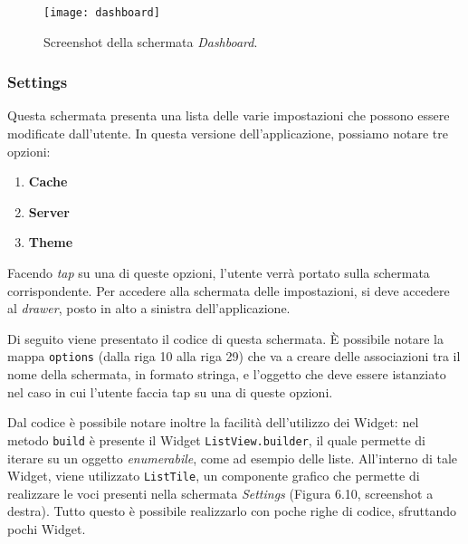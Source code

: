 \begin{figure}[htp]
	\centering
	\texttt{[image: dashboard]}
	\caption[Screenshot - Dashboard]{Screenshot della schermata \textit{Dashboard}.}\label{xyz}
\end{figure}

\newpage

\subsubsection{Settings}
Questa schermata presenta una lista delle varie impostazioni che possono essere modificate dall'utente. In questa versione dell'applicazione, possiamo notare tre opzioni:
\begin{enumerate}
	\item \textbf{Cache}
	\item \textbf{Server}
	\item \textbf{Theme}
\end{enumerate}

Facendo \textit{tap} su una di queste opzioni, l'utente verrà portato sulla schermata corrispondente. Per accedere alla schermata delle impostazioni, si deve accedere al \textit{drawer}, posto in alto a sinistra dell'applicazione.

Di seguito viene presentato il codice di questa schermata. È possibile notare la mappa \verb|options| (dalla riga 10 alla riga 29) che va a creare delle associazioni tra il nome della schermata, in formato stringa, e l'oggetto che deve essere istanziato nel caso in cui l'utente faccia tap su una di queste opzioni.

Dal codice è possibile notare inoltre la facilità dell'utilizzo dei Widget: nel metodo \verb|build| è presente il Widget \verb|ListView.builder|, il quale permette di iterare su un oggetto \textit{enumerabile}, come ad esempio delle liste. All'interno di tale Widget, viene utilizzato \verb|ListTile|, un componente grafico che permette di realizzare le voci presenti nella schermata \textit{Settings} (Figura 6.10, screenshot a destra). Tutto questo è possibile realizzarlo con poche righe di codice, sfruttando pochi Widget.

